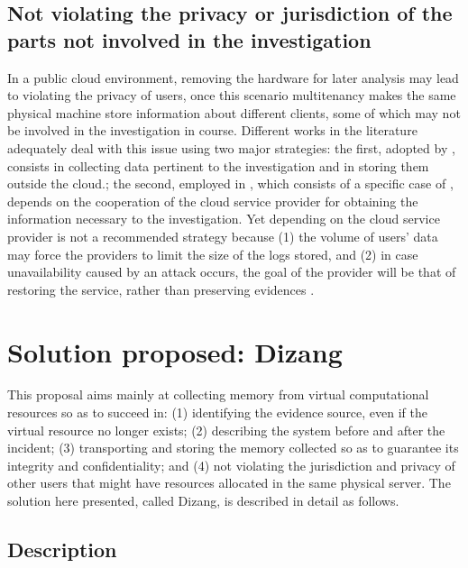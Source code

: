 \documentclass[conference]{IEEEtran}
\newcommand{\fancyname}{Dizang }
\begin{document}
\subsection{Not violating the privacy or jurisdiction of the parts not involved in the investigation}

In a public cloud environment, removing the hardware for later analysis may lead to violating the privacy of users, once this scenario multitenancy makes the same physical machine store information about different clients, some of which may not be involved in the investigation in course.
%
Different works in the literature adequately deal with this issue using two major strategies: the first, adopted by \cite{Reichert_Auto_acquisition:2015,George_DF2CE:2012,Poisel_VMI:2013,Dykstra_FROST:2013}, consists in collecting data pertinent to the investigation and in storing them outside the cloud.; the second, employed in \cite{Sang_Log_approach:2013}, which consists of a specific case of \cite{George_DF2CE:2012}, depends on the cooperation of the cloud service provider for obtaining  the information necessary to the investigation. 
%
Yet depending on the cloud service provider is not a recommended strategy because (1) the volume of users’ data may force the providers to limit the size of the logs stored, and (2) in case unavailability caused by an attack occurs, the goal of the provider will be that of restoring the service, rather than preserving evidences \cite{Clarke_Review_of_Challenges:2015}. 



\section{Solution proposed: \fancyname}
\label{sec:proposal}

This proposal aims mainly at collecting memory from virtual computational resources so as to succeed in: 
(1) identifying the evidence source, even if the virtual resource no longer exists; 
(2) describing the system before and after the incident;
(3) transporting and storing the memory collected so as to guarantee its integrity and confidentiality; and
(4) not violating the jurisdiction and privacy of other users that might have resources allocated in the same physical server.
%
The solution here presented, called Dizang, is described in detail as follows.


\subsection{Description}
\label{sec:proposal-desc}
\end{document}
